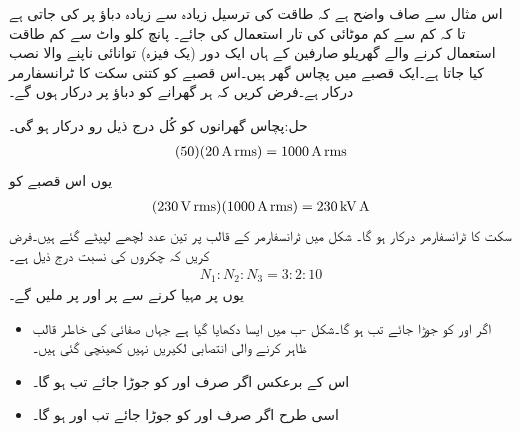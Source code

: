 اس مثال سے صاف واضح ہے کہ طاقت کی ترسیل زیادہ سے زیادہ دباؤ پر کی جاتی ہے تا کہ کم سے کم موٹائی کی تار استعمال کی جائے۔
پانچ کلو واٹ سے کم طاقت استعمال کرنے والے گھریلو صارفین کے ہاں ایک دور (یک فیزہ) توانائی ناپنے والا  نصب کیا جاتا ہے۔ایک قصبے میں پچاس گھر ہیں۔اس قصبے کو کتنی سکت کا ٹرانسفارمر درکار ہے۔فرض کریں کہ ہر گھرانے کو  دباؤ پر  درکار ہوں گے۔

حل:پچاس گھرانوں کو کُل درج ذیل رو درکار ہو گی۔
\begin{align*}
(50)(\SI{20}{\ampere}\,{\textup{rms}})=\SI{1000}{\ampere}\,{\textup{rms}}
\end{align*}
یوں اس قصبے کو
\begin{align*}
(\SI{230}{\volt}\,{\textup{rms}})(\SI{1000}{\ampere}\,{\textup{rms}})=\SI{230}{\kilo\volt\ampere}
\end{align*}
سکت کا ٹرانسفارمر درکار ہو گا۔
شکل  میں ٹرانسفارمر کے قالب پر تین عدد لچھے لپیٹے گئے ہیں۔فرض کریں کہ چکروں کی نسبت درج ذیل ہے۔
\begin{align*}
N_1:N_2:N_3=3:2:10
\end{align*}
 یوں  پر  مہیا کرنے سے  پر  اور  پر  ملیں گے۔
\begin{itemize}
\item
اگر  اور  کو جوڑا جائے تب  ہو گا۔شکل -ب میں ایسا دکھایا گیا ہے  جہاں صفائی کی خاطر قالب ظاہر کرنے والی  انتصابی  لکیریں نہیں کھینچی گئی ہیں۔
\item
اس کے برعکس اگر صرف  اور  کو جوڑا جائے تب  ہو گا۔
\item
اسی طرح  اگر صرف  اور  کو جوڑا جائے تب  اور  ہو گا۔
\end{itemize}

